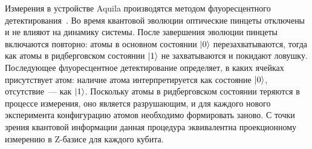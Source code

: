 Измерения в устройстве Aquila производятся методом флуоресцентного детектирования~\cite{bakr2009microscope}.
Во время квантовой эволюции оптические пинцеты отключены и не влияют на динамику системы.
После завершения эволюции пинцеты включаются повторно: атомы в основном состоянии $\ket{0}$ перезахватываются, тогда как атомы
в ридберговском состоянии $\ket{1}$ не захватываются и покидают ловушку.
Последующее флуоресцентное детектирование определяет, в каких ячейках присутствует атом: наличие атома
интерпретируется как состояние $\ket{0}$, отсутствие~--- как $\ket{1}$.
Поскольку атомы в ридберговском состоянии теряются в процессе измерения, оно является разрушающим, и для каждого нового
эксперимента конфигурацию атомов необходимо формировать заново.
С точки зрения квантовой информации данная процедура эквивалентна проекционному измерению в Z-базисе для каждого кубита.

